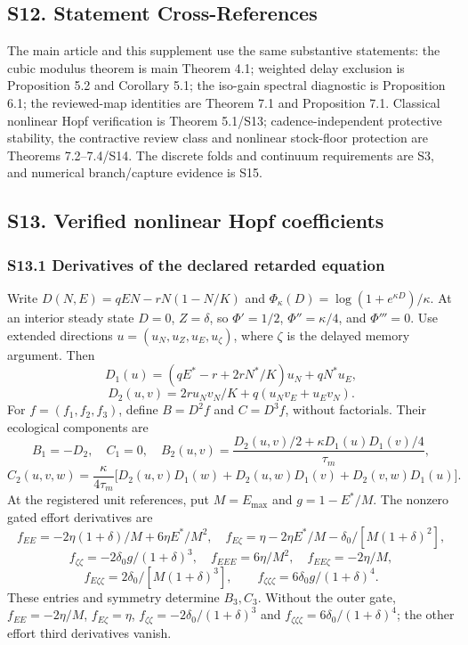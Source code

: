 \documentclass[
  10pt,
  a4paper,
]{article}
\begin{document}
\subsection{S12. Statement
Cross-References}\label{s12.-statement-cross-references}

The main article and this supplement use the same substantive
statements: the cubic modulus theorem is main Theorem 4.1; weighted
delay exclusion is Proposition 5.2 and Corollary 5.1; the iso-gain
spectral diagnostic is Proposition 6.1; the reviewed-map identities are
Theorem 7.1 and Proposition 7.1. Classical nonlinear Hopf verification
is Theorem 5.1/S13; cadence-independent protective stability, the
contractive review class and nonlinear stock-floor protection are
Theorems 7.2--7.4/S14. The discrete folds and continuum requirements are
S3, and numerical branch/capture evidence is S15.

\subsection{S13. Verified nonlinear Hopf
coefficients}\label{s13.-verified-nonlinear-hopf-coefficients}

\subsubsection{S13.1 Derivatives of the declared retarded
equation}\label{s13.1-derivatives-of-the-declared-retarded-equation}

Write \(D(N,E)=qEN-rN(1-N/K)\) and
\(\Phi_\kappa(D)=\log(1+e^{\kappa D})/\kappa\). At an interior steady
state \(D=0\), \(Z=\delta\), so \(\Phi'=1/2\), \(\Phi''=\kappa/4\), and
\(\Phi'''=0\). Use extended directions \(u=(u_N,u_Z,u_E,u_\zeta)\),
where \(\zeta\) is the delayed memory argument. Then
\[D_1(u)=(qE^*-r+2rN^*/K)u_N+qN^*u_E,\]
\[D_2(u,v)=2r u_Nv_N/K+q(u_Nv_E+u_Ev_N).\] For \(f=(f_1,f_2,f_3)\),
define \(B=D^2f\) and \(C=D^3f\), without factorials. Their ecological
components are
\[B_1=-D_2,\quad C_1=0,\quad B_2(u,v)=\frac{D_2(u,v)/2+\kappa D_1(u)D_1(v)/4}{\tau_m},\]
\[C_2(u,v,w)=\frac{\kappa}{4\tau_m}\big[D_2(u,v)D_1(w)+D_2(u,w)D_1(v)+D_2(v,w)D_1(u)\big].\]
At the registered unit references, put \(M=E_{\max}\) and \(g=1-E^*/M\).
The nonzero gated effort derivatives are
\[f_{EE}=-2\eta(1+\delta)/M+6\eta E^*/M^2,\quad f_{E\zeta}=\eta-2\eta E^*/M-\delta_0/[M(1+\delta)^2],\]
\[f_{\zeta\zeta}=-2\delta_0g/(1+\delta)^3,\quad f_{EEE}=6\eta/M^2,\quad f_{EE\zeta}=-2\eta/M,\]
\[f_{E\zeta\zeta}=2\delta_0/[M(1+\delta)^3],\qquad f_{\zeta\zeta\zeta}=6\delta_0g/(1+\delta)^4.\]
These entries and symmetry determine \(B_3,C_3\). Without the outer
gate, \(f_{EE}=-2\eta/M\), \(f_{E\zeta}=\eta\),
\(f_{\zeta\zeta}=-2\delta_0/(1+\delta)^3\) and
\(f_{\zeta\zeta\zeta}=6\delta_0/(1+\delta)^4\); the other effort third
derivatives vanish.
\end{document}
